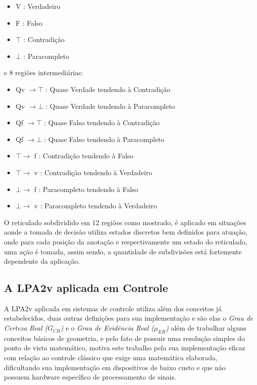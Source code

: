 \begin{itemize}
\item V : Verdadeiro
\item F : Falso
\item $\top$ : Contradição
\item $\bot$ : Paracompleto
\end{itemize}
e 8 regiões intermediárias: 
\begin{itemize}
\item Qv $\rightarrow  \top$ : Quase Verdade tendendo à Contradição
\item Qv $\rightarrow  \bot$ : Quase Verdade tendendo à  Paracompleto
\item Qf $\rightarrow  \top$ : Quase Falso tendendo à Contradição
\item Qf $\rightarrow  \bot$ : Quase Falso tendendo à Paracompleto
\item $\top \rightarrow $ f : Contradição tendendo à Falso
\item $\top \rightarrow $ v : Contradição tendendo à Verdadeiro
\item $\bot \rightarrow $ f : Paracompleto tendendo à Falso
\item $\bot \rightarrow $ v : Paracompleto tendendo à Verdadeiro

\end{itemize}

O reticulado sobdividido em 12 regiões como mostrado, é aplicado em situações aonde a tomada de decisão utiliza estados discretos bem definidos para atuação, onde para cada posição da anotação e respectivamente um estado do reticulado, uma ação é tomada, assim sendo, a quantidade de subdivisões está fortemente dependente da aplicação.



\subsection{A LPA2v aplicada em Controle}

A LPA2v aplicada em sistemas de controle utiliza além dos conceitos já estabelecidos, duas outras definições para sua implementação e são elas o \emph{ Grau de Certeza Real ($G _{CR}$)} e o \emph{Grau de Evidência Real ($\mu _{ER}$)} além de trabalhar alguns conceitos básicos de geometria, e pelo fato de possuir uma resolução simples do ponto de vista matemático, motiva este trabalho pela sua implementação eficaz com relação ao controle clássico que exige uma matemática elaborada, dificultando sua implementação em dispositivos de baixo custo e que não possuem hardware específico de processamento de sinais. 


